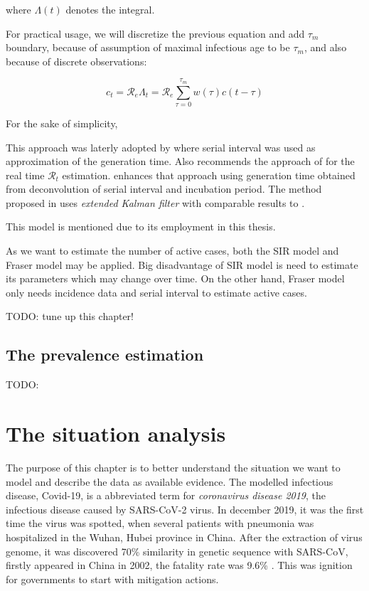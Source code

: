 \documentclass[
  digital, %
  oneside, %
  lof,     %
  lot,     %
]{fithesis4}
\begin{document}
where $\Lambda(t)$ denotes the integral.

For practical usage, we will discretize the previous equation 
and add $\tau_m$ boundary, because of assumption of maximal 
infectious age to be $\tau_m$, and also because of discrete 
observations:

\begin{equation}
c_t = \mathcal{R}_e \Lambda_t = \mathcal{R}_e \sum^{\tau_m}_{\tau=0} w(\tau) c(t - \tau)
\end{equation}

For the sake of simplicity, 

This approach was laterly adopted by \cite{cori2013} where serial 
interval was used as approximation of the generation time.
Also \cite{gostic2020} recommends the approach of \cite{cori2013} 
for the real time $\mathcal{R}_t$ estimation. \cite{knight2020} 
enhances that approach using generation time obtained from 
deconvolution of serial interval and incubation period. 
The method proposed in \cite{hasan2020} uses 
\textit{extended Kalman filter} with comparable results 
to \cite{cori2013}.

This model is mentioned due to its employment in this thesis.

As we want to estimate the number of active cases, both the 
SIR model and Fraser model may be applied. 
Big disadvantage of SIR model is need to estimate its 
parameters which may change over time. 
On the other hand, Fraser model only needs incidence 
data and serial interval to estimate active cases.

TODO: tune up this chapter!

\section{The prevalence estimation}

TODO:



\chapter{The situation analysis}

The purpose of this chapter is to better understand the situation 
we want to model and describe the data as available evidence. 
The modelled infectious disease, Covid-19, is a abbreviated 
term for \textit{coronavirus disease 2019}, the infectious disease 
caused by SARS-CoV-2 virus. 
In december 2019, it was the first time the virus was spotted, 
when several patients with pneumonia was hospitalized in the 
Wuhan, Hubei province in China. 
After the extraction of virus genome, it was discovered 
70\% similarity in genetic sequence with SARS-CoV, 
firstly appeared in China in 2002, the fatality rate 
was 9.6\% \cite{hui2019}.
This was ignition for governments to start with mitigation 
actions.
\end{document}
